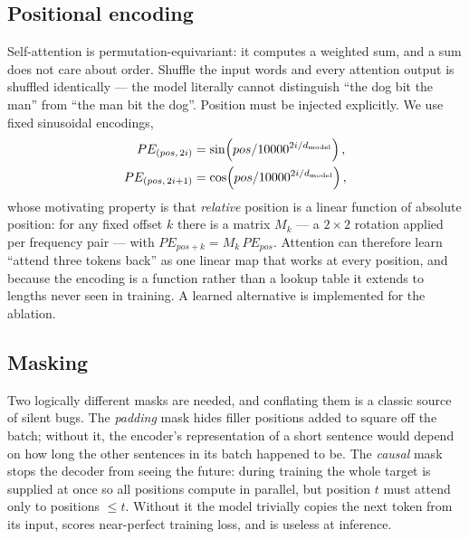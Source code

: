 \documentclass[11pt,a4paper]{article}
\begin{document}

\subsection{Positional encoding}

Self-attention is permutation-equivariant: it computes a weighted sum, and a
sum does not care about order. Shuffle the input words and every attention
output is shuffled identically --- the model literally cannot distinguish ``the
dog bit the man'' from ``the man bit the dog''. Position must be injected
explicitly. We use fixed sinusoidal encodings,
\begin{align}
PE_{(pos,\,2i)}   &= \sin\!\left(pos / 10000^{2i/d_{\mathrm{model}}}\right), \\
PE_{(pos,\,2i+1)} &= \cos\!\left(pos / 10000^{2i/d_{\mathrm{model}}}\right),
\end{align}
whose motivating property is that \emph{relative} position is a linear function
of absolute position: for any fixed offset $k$ there is a matrix $M_k$ --- a
$2\times 2$ rotation applied per frequency pair --- with $PE_{pos+k} = M_k\,
PE_{pos}$. Attention can therefore learn ``attend three tokens back'' as one
linear map that works at every position, and because the encoding is a function
rather than a lookup table it extends to lengths never seen in training. A
learned alternative is implemented for the ablation.


\subsection{Masking}

Two logically different masks are needed, and conflating them is a classic
source of silent bugs. The \emph{padding} mask hides filler positions added to
square off the batch; without it, the encoder's representation of a short
sentence would depend on how long the other sentences in its batch happened to
be. The \emph{causal} mask stops the decoder from seeing the future: during
training the whole target is supplied at once so all positions compute in
parallel, but position $t$ must attend only to positions $\le t$. Without it
the model trivially copies the next token from its input, scores near-perfect
training loss, and is useless at inference.
\end{document}
